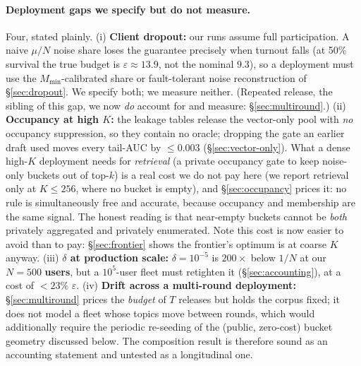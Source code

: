 \documentclass[pdflatex,sn-mathphys-num,iicol]{sn-jnl}
\theoremstyle{thmstyleone}%
\theoremstyle{thmstyletwo}%
\theoremstyle{thmstylethree}%
\newcommand{\eps}{\varepsilon}
\newcommand{\secref}[1]{\S\ref{#1}}
\begin{document}
\paragraph{Deployment gaps we specify but do not measure.} Four, stated plainly.
(i) \textbf{Client dropout:} our runs assume full participation. A naive $\mu/N$ noise share loses
the guarantee precisely when turnout falls (at 50\% survival the true budget is $\eps \approx 13.9$,
not the nominal $9.3$), so a deployment must use the $M_{\min}$-calibrated share or fault-tolerant
noise reconstruction of \secref{sec:dropout}. We specify both; we measure neither. (Repeated release,
the sibling of this gap, we now \emph{do} account for and measure: \secref{sec:multiround}.)
(ii) \textbf{Occupancy at high $K$:} the leakage tables release the vector-only pool with \emph{no}
occupancy suppression, so they contain no oracle; dropping the gate an earlier draft used moves every
tail-AUC by $\leq 0.003$ (\secref{sec:vector-only}). What a dense high-$K$ deployment needs for
\emph{retrieval} (a private occupancy gate to keep noise-only buckets out of top-$k$) is a real
cost we do not pay here (we report retrieval only at $K \leq 256$, where no bucket is empty), and
\secref{sec:occupancy} prices it: no rule is simultaneously free and accurate, because occupancy and
membership are the same signal. The honest reading is that near-empty buckets cannot be \emph{both}
privately aggregated and privately enumerated. Note this cost is now easier to avoid than to pay:
\secref{sec:frontier} shows the frontier's optimum is at coarse $K$ anyway.
(iii) \textbf{$\delta$ at production scale:} $\delta = 10^{-5}$ is $200\times$ below $1/N$ at our
$N = 500$ \textbf{users}, but a $10^{5}$-user fleet must retighten it (\secref{sec:accounting}), at a
cost of $< 23\%$ $\eps$.
(iv) \textbf{Drift across a multi-round deployment:} \secref{sec:multiround} prices the \emph{budget}
of $T$ releases but holds the corpus fixed; it does not model a fleet whose topics move between
rounds, which would additionally require the periodic re-seeding of the (public, zero-cost) bucket
geometry discussed below. The composition result is therefore sound as an accounting statement and
untested as a longitudinal one.
\end{document}
